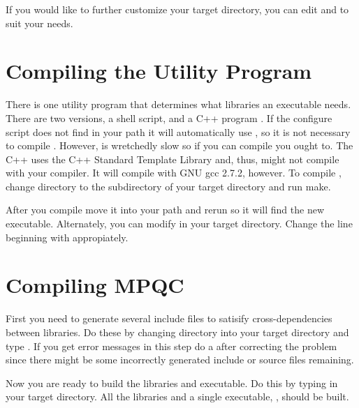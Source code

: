   If you would like to further customize your target directory,
you can edit  and  to
suit your needs.

\section{Compiling the Utility Program}

 There is one utility program that determines what libraries an executable
needs.  There are two versions, a shell script,  and a
C++ program .  If the configure script does not find
 in your path it will automatically use
, so it is not necessary to compile .
However,  is wretchedly slow so if you can compile
 you ought to.  The C++  uses the C++
Standard Template Library and, thus, might not compile with your compiler.
It will compile with GNU gcc 2.7.2, however.  To compile ,
change directory to the  subdirectory of your
target directory and run make.

 After you compile  move it into your path and
rerun  so it will find the new executable.  Alternately,
you can modify  in your target directory.
Change the line beginning with  appropiately.

\section{Compiling MPQC}

 First you need to generate several include files to satisify
cross-dependencies between libraries.  Do these by changing directory into
your target directory and type .  If you get error
messages in this step do a  after correcting the
problem since there might be some incorrectly generated include or source
files remaining.

 Now you are ready to build the libraries and executable.  Do this
by typing  in your target directory.  All the libraries and
a single executable, , should be built.

